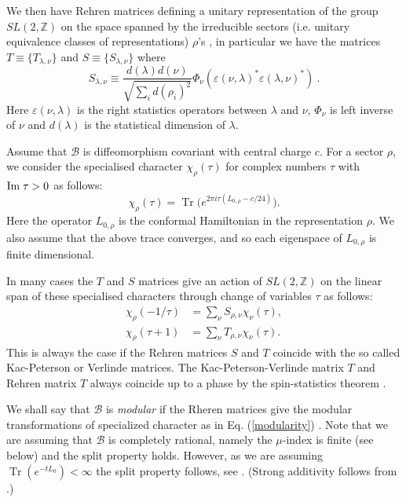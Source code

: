 \documentclass[11pt]{article}
\DeclareMathOperator{\Tr}{Tr}
\def\e{\varepsilon}
\def\l{\lambda}
\def\r{\rho}
\def\B{{\cal B}}
\def\B{{\mathcal B}}
\begin{document}
We then have Rehren \cite{R1} matrices defining
a unitary representation of the group $SL(2,{\mathbb Z})$ on the space spanned by the irreducible sectors (i.e. unitary equivalence classes of representations) $\r$'s , in particular we have the matrices $T \equiv \{T_{\l,\nu}\}$ and $S \equiv \{S_{\l,\nu}\}$ where
\begin{equation}\label{matS}
S_{\l,\nu}\equiv 
\frac{d(\l)d(\nu)}{\sqrt{\sum_i d(\r_i)^2}}\Phi_{\nu}(\e(\nu,\l)^*\e(\l,\nu)^*) \ .
\end{equation}
Here $\e(\nu,\l)$ is the right statistics operators between $\l$
and $\nu$, $\Phi_{\nu}$ is left inverse of $\nu$ and $d(\l)$ is the 
statistical dimension of $\l$.  

Assume that $\B$ is diffeomorphism covariant with central charge $c$.
For a sector $\r$, we consider the specialised character
$\chi_\r(\tau)$ for complex numbers $\tau$ with ${\rm Im}\; \tau >0$
as follows:
\[
\chi_\r(\tau)=\Tr\!\big(e^{2\pi i\tau (L_{0,\r}-c/24)}\big).
\]
Here the operator $L_{0,\r}$ is the conformal Hamiltonian in 
the representation $\r$.  We also assume that the above trace converges, and so each eigenspace 
of $L_{0,\r}$ is finite dimensional.  

In many cases the $T$ and $S$ matrices give an action
of $SL(2,{\mathbb Z})$ on the linear span of these specialised
characters through change of variables $\tau$ as follows:
%
\begin{equation}\label{modularity}
\begin{split}
\chi_\r(-1/\tau)&= \sum_\nu S_{\r,\nu} \chi_\nu(\tau),\\
\chi_\r(\tau+1)&= \sum_\nu T_{\r,\nu} \chi_\nu(\tau).
\end{split}
\end{equation}
%
This is always the case if the Rehren matrices $S$ and $T$ coincide with the  
so called Kac-Peterson or Verlinde matrices.
The Kac-Peterson-Verlinde matrix $T$ and Rehren matrix $T$ always coincide
up to a phase by the spin-statistics theorem \cite{GL2}.

We shall say that $\B$ is \emph{modular} if  the Rheren matrices give the modular 
transformations of specialized character as in Eq. (\ref{modularity}) .  
Note that we are assuming that $\B$ is completely rational, namely the $\mu$-index is finite 
(see below) and the split property holds. However, as we are assuming
$\Tr(e^{-tL_{0}})<\infty$ the split property follows, see \cite{BDL}. 
(Strong additivity follows from  \cite{LX}.)
\end{document}
